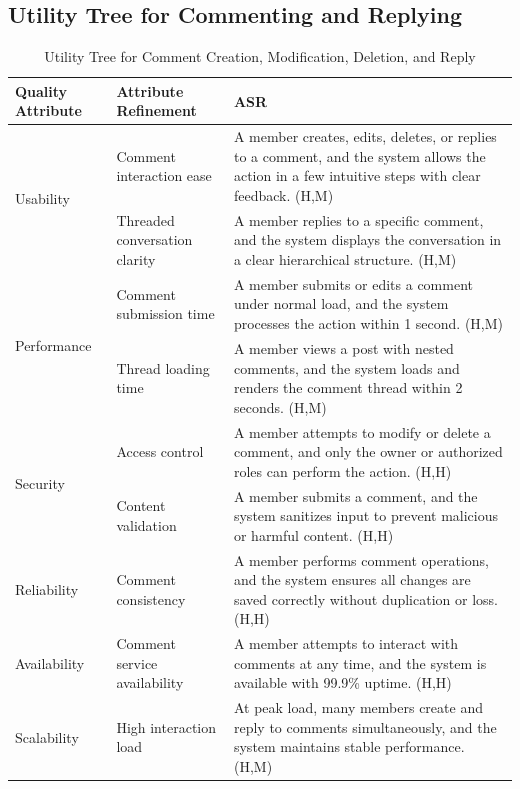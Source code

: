\documentclass{article}
\begin{document}
\subsection{Utility Tree for Commenting and Replying}

\begin{table}[H]
\centering
\caption{Utility Tree for Comment Creation, Modification, Deletion, and Reply}
\begin{tabular}{|p{3cm}|p{4cm}|p{7cm}|}
\hline
\textbf{Quality Attribute} & \textbf{Attribute Refinement} & \textbf{ASR} \\
\hline

\multirow{2}{*}{Usability}
& Comment interaction ease
& A member creates, edits, deletes, or replies to a comment, and the system allows the action in a few intuitive steps with clear feedback. (H,M) \\
\cline{2-3}
& Threaded conversation clarity
& A member replies to a specific comment, and the system displays the conversation in a clear hierarchical structure. (H,M) \\
\hline

\multirow{2}{*}{Performance}
& Comment submission time
& A member submits or edits a comment under normal load, and the system processes the action within 1 second. (H,M) \\
\cline{2-3}
& Thread loading time
& A member views a post with nested comments, and the system loads and renders the comment thread within 2 seconds. (H,M) \\
\hline

\multirow{2}{*}{Security}
& Access control
& A member attempts to modify or delete a comment, and only the owner or authorized roles can perform the action. (H,H) \\
\cline{2-3}
& Content validation
& A member submits a comment, and the system sanitizes input to prevent malicious or harmful content. (H,H) \\
\hline

Reliability
& Comment consistency
& A member performs comment operations, and the system ensures all changes are saved correctly without duplication or loss. (H,H) \\
\hline

Availability
& Comment service availability
& A member attempts to interact with comments at any time, and the system is available with 99.9\% uptime. (H,H) \\
\hline

Scalability
& High interaction load
& At peak load, many members create and reply to comments simultaneously, and the system maintains stable performance. (H,M) \\
\hline

\end{tabular}
\end{table}
\end{document}
